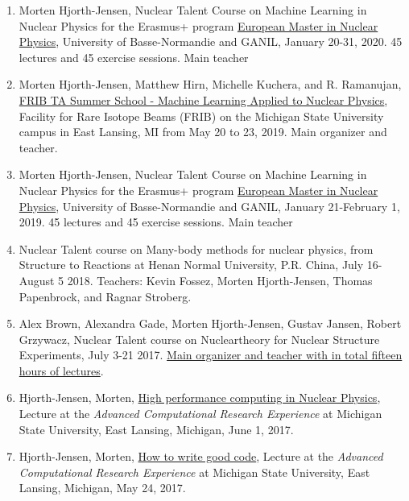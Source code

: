 \documentclass[aps,floatfix,preprint]{revtex4-1}
\begin{document}
\begin{enumerate}
  
\item Morten Hjorth-Jensen, Nuclear Talent Course on Machine Learning in Nuclear Physics for the Erasmus+ program \href{{http://www.emm-nucphys.eu/}}{European Master in Nuclear Physics}, University of Basse-Normandie and GANIL, January 20-31, 2020. 45 lectures and 45 exercise sessions. Main teacher

\item Morten Hjorth-Jensen, Matthew Hirn, Michelle Kuchera, and R. Ramanujan, \href{{https://indico.frib.msu.edu/event/16/}}{FRIB TA Summer School - Machine Learning Applied to Nuclear Physics}, Facility for Rare Isotope Beams (FRIB) on the Michigan State University campus in East Lansing, MI from May 20 to 23, 2019. Main organizer and teacher.

\item Morten Hjorth-Jensen, Nuclear Talent Course on Machine Learning in Nuclear Physics for the Erasmus+ program \href{{http://www.emm-nucphys.eu/}}{European Master in Nuclear Physics}, University of Basse-Normandie and GANIL, January 21-February 1, 2019. 45 lectures and 45 exercise sessions. Main teacher

\item Nuclear Talent course on Many-body methods for nuclear physics, from Structure to Reactions at Henan Normal University, P.R. China, July 16-August 5 2018. Teachers: Kevin Fossez, Morten Hjorth-Jensen, Thomas Papenbrock, and Ragnar Stroberg. 
  
\item Alex Brown, Alexandra Gade, Morten Hjorth-Jensen, Gustav Jansen, Robert Grzywacz, Nuclear Talent course on Nucleartheory for Nuclear Structure Experiments, July 3-21 2017. \href{{https://github.com/NuclearTalent/NuclearStructure}}{Main organizer and teacher with in total fifteen hours of lectures}. 

\item Hjorth-Jensen, Morten, \href{{https://icer-acres.msu.edu/summer-2017/schedule/}}{High performance computing in Nuclear Physics}, Lecture at the \emph{Advanced Computational Research Experience} at Michigan State University, East Lansing, Michigan, June 1, 2017.

\item Hjorth-Jensen, Morten, \href{{https://icer-acres.msu.edu/summer-2017/schedule/}}{How to write good code}, Lecture at the \emph{Advanced Computational Research Experience} at Michigan State University, East Lansing, Michigan, May 24, 2017.


\end{enumerate}
\end{document}
